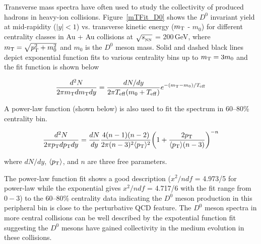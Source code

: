 Transverse mass spectra have often used to study the collectivity of produced hadrons in heavy-ion collisions. Figure~\ref{mTFit_D0} shows the $D^{0}$ invariant yield at mid-rapidity ($|y|<1$) vs. transverse kinetic energy ($m_{\rm T}$ - $m_{0}$) for different centrality classes in Au + Au collisions at $\sqrt{s_{_{\rm NN}}}$ = 200\,GeV, where $m_{\rm T} = \sqrt{p_{\rm T}^2+m_0^2}$ and $m_0$ is the $D^0$ meson mass. Solid and dashed black lines depict exponential function fits to various centrality bins up to $m_{\rm T} = 3m_{0}$ and the fit function is shown below

\begin{equation}
\frac{d^2N}{2\pi m_{\rm T}dm_{\rm T}dy} = \frac{dN/dy}{2\pi T_{\rm eff}(m_0+T_{\rm eff})}e^{-(m_{\rm T}-m_0)/T_{\rm eff}}
\end{equation}

A power-law function (shown below) is also used to fit the spectrum in 60--80\% centrality bin. 

\begin{equation}
\frac{d^2N}{2\pi p_{\rm T}dp_{\rm T}dy} = \frac{dN}{dy}\frac{4(n-1)(n-2)}{2\pi (n-3)^2\langle p_{\rm T} \rangle ^2}\bigg(1+\frac{2p_{\rm T}}{\langle p_{\rm T} \rangle (n-3)}\bigg)^{-n}
\end{equation}

where $dN/dy$, $\langle p_{\rm T}\rangle$, and $n$ are three free parameters. 

The power-law function fit shows a good description ($x^{2}/ndf$ = 4.973/5 for power-law while the exponential gives $x^{2}/ndf$ = 4.717/6 with the fit range from $0 - 3$) to the 60--80\% centrality data indicating the $D^0$ meson production in this peripheral bin is close to the perturbative QCD feature. The $D^0$ meson spectra in more central collisions can be well described by the expotential function fit suggesting the $D^0$ mesons have gained collectivity in the medium evolution in these collisions.

